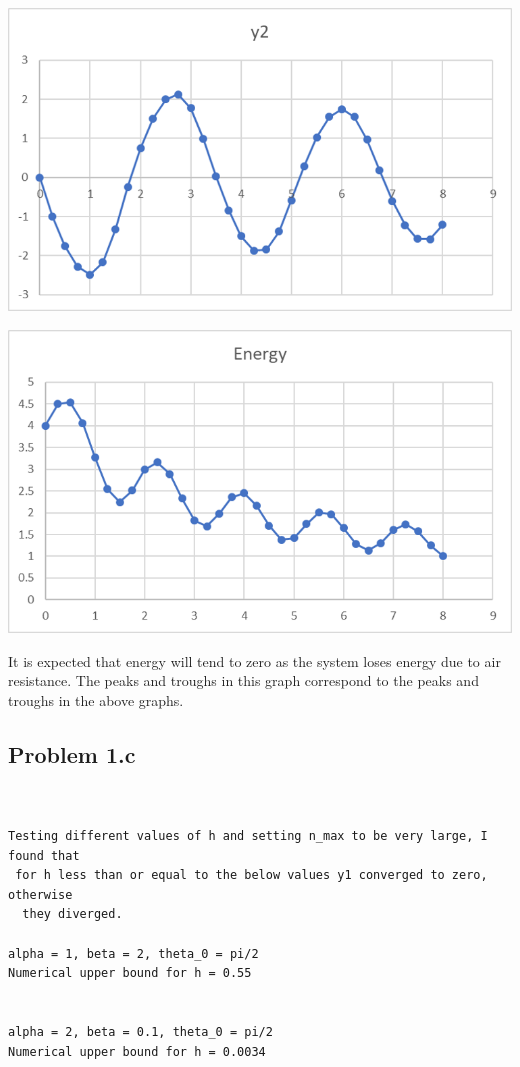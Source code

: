 \documentclass[a4paper,12pt,onecolumn,final]{article}
\begin{document}
\includegraphics[scale=1]{CW_1D/CW_1DP1/Q1by2.png} 

\includegraphics[scale=1]{CW_1D/CW_1DP1/Q1bEnergy.png} 

It is expected that energy will tend to zero as the system loses energy due to air resistance. The peaks and troughs in this graph correspond to the peaks and troughs in the above graphs.

\subsection*{Problem 1.c}

\begin{verbatim}


Testing different values of h and setting n_max to be very large, I found that
 for h less than or equal to the below values y1 converged to zero, otherwise
  they diverged. 

alpha = 1, beta = 2, theta_0 = pi/2 
Numerical upper bound for h = 0.55


alpha = 2, beta = 0.1, theta_0 = pi/2
Numerical upper bound for h = 0.0034

\end{verbatim}
\end{document}
